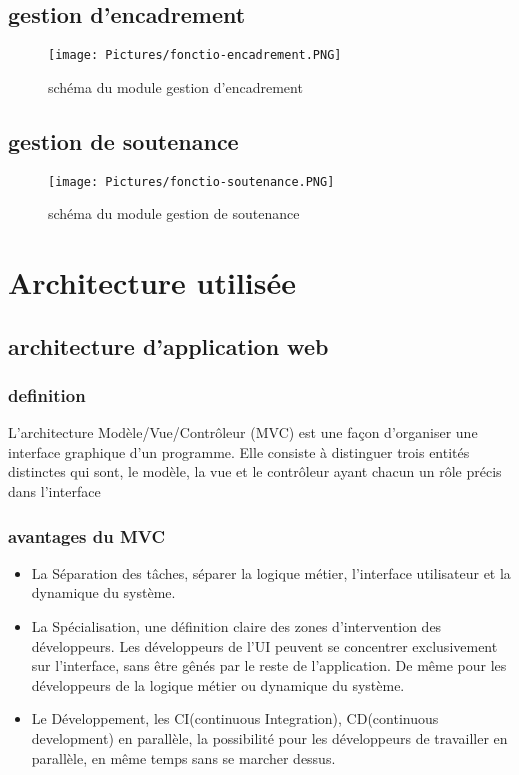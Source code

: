 \documentclass[11pt,fleqn]{book} %
\begin{document}
\subsection{gestion d'encadrement}
\begin{figure}[h]
    \centering
    \texttt{[image: Pictures/fonctio-encadrement.PNG]}
        \caption{schéma du module gestion d'encadrement}
\end{figure}
\newpage
\subsection{gestion de soutenance}
\begin{figure}[h]
    \centering
    \texttt{[image: Pictures/fonctio-soutenance.PNG]}
        \caption{schéma du module gestion de soutenance}
\end{figure}
\newpage
\section{Architecture utilisée}
\subsection{architecture d'application web}
\subsubsection{definition}
L'architecture Modèle/Vue/Contrôleur (MVC) est une façon d'organiser une interface graphique d'un programme. Elle consiste à distinguer trois entités distinctes qui sont, le modèle, la vue et le contrôleur ayant chacun un rôle précis dans l'interface
\subsubsection{avantages du MVC}
\begin{itemize}
    \item La Séparation des tâches, séparer la logique métier, l’interface utilisateur et la dynamique du système.
    \item La Spécialisation, une définition claire des zones d'intervention des développeurs. Les développeurs de l’UI peuvent se concentrer exclusivement sur l’interface, sans être gênés par le reste de l'application. De même pour les développeurs de la logique métier ou dynamique du système.
    \item Le Développement, les CI(continuous Integration), CD(continuous development) en parallèle, la possibilité pour les développeurs de travailler en parallèle, en même temps sans se marcher dessus.
\end{itemize}
\end{document}
